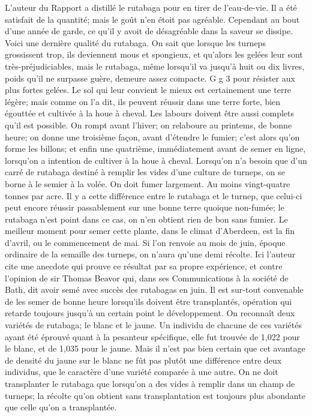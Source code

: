L'auteur du Rapport a distillé le rutabaga pour en tirer de l'eau-de-vie. Il a été satisfait de la quantité; mais le goût n'en étoit pas agréable. Cependant au bout d'une année de garde, ce qu'il y avoit de désagréable dans la saveur se dissipe.
Voici une dernière qualité du rutabaga. On sait que lorsque les turneps grossissent trop, ils deviennent mous et spongieux, et qu'alors les gelées leur sont très-préjudiciables, mais le rutabaga, même lorsqu'il va jusqu'à huit ou dix livres, poids qu'il ne surpasse guère, demeure assez compacte.
G g 3\setcounter{page}{378} pour résister aux plus fortes gelées.
Le sol qui leur convient le mieux est certainement une terre légère; mais comme on l'a dit, ils peuvent réussir dans une terre forte, bien égouttée et cultivée à la houe à cheval.
Les labours doivent être aussi complets qu'il est possible. On rompt avant l'hiver; on relaboure au printems, de bonne heure; on donne une troisième façon, avant d'étendre le fumier; c'est alors qu'on forme les billons; et enfin une quatrième, immédiatement avant de semer en ligne, lorsqu'on a intention de cultiver à la houe à cheval.
Lorsqu'on n'a besoin que d'un carré de rutabaga destiné à remplir les vides d'une culture de turneps, on se borne à le semier à la volée.
On doit fumer largement. Au moins vingt-quatre tonnes par acre. Il y a cette différence entre le rutabaga et le turnep, que celui-ci peut encore réussir passablement sur une bonne terre quoique non-fumée; le rutabaga n'est point dans ce cas, on n'en obtient rien de bon sans fumier.
Le meilleur moment pour semer cette plante, dans le climat d'Aberdeen, est la fin d'avril, ou le commencement de mai. Si l'on renvoie au mois de juin, époque ordinaire\setcounter{page}{379} de la semaille des turneps, on n'aura qu'une demi récolte. Ici l'auteur cite une anecdote qui prouve ce résultat par sa propre expérience, et contre l'opinion de sir Thomas Beavor qui, dans ses Communications à la société de Bath, dit avoir semé avec succès des rutabagas en juin. Il est sur-tout convenable de les semer de bonne heure lorsqu'ils doivent être transplantés, opération qui retarde toujours jusqu'à un certain point le développement.
On reconnaît deux variétés de rutabaga; le blanc et le jaune. Un individu de chacune de ces variétés ayant été éprouvé quant à la pesanteur spécifique, elle fut trouvée de 1,022 pour le blanc, et de 1,035 pour le jaune. Mais il n'est pas bien certain que cet avantage de densité du jaune sur le blanc ne fût pas plutôt une différence entre deux individus, que le caractère d'une variété comparée à une autre.
On ne doit transplanter le rutabaga que lorsqu'on a des vides à remplir dans un champ de turneps; la récolte qu'on obtient sans transplantation est toujours plus abondante que celle qu'on a transplantée.
